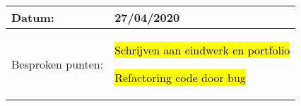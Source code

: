 \begin{tabularx}{\textwidth}{| l | X |}
  \hline
  Datum: & 27/04/2020\\
  \hline
  Besproken punten: &
  \begin{compactitem}
    \item \hl{Schrijven aan eindwerk en portfolio}
    \item \hl{Refactoring code door bug}
  \end{compactitem}\\
  \hline
\end{tabularx}